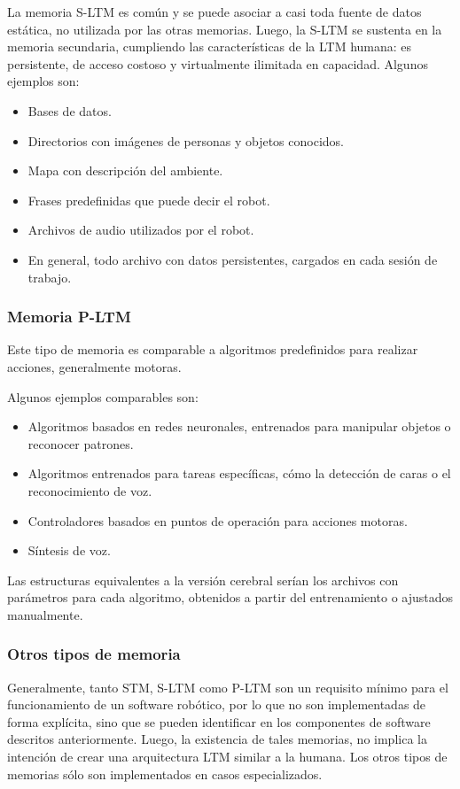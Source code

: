 La memoria S-LTM es común y se puede asociar a casi toda fuente de datos estática, no utilizada por las otras memorias. Luego, la S-LTM se sustenta en la memoria secundaria, cumpliendo las características de la LTM humana: es persistente, de acceso costoso y virtualmente ilimitada en capacidad. Algunos ejemplos son:
\begin{itemize}[topsep=0pt]
\setlength\itemsep{0.2em}
\item Bases de datos.
\item Directorios con imágenes de personas y objetos conocidos.
\item Mapa con descripción del ambiente.
\item Frases predefinidas que puede decir el robot.
\item Archivos de audio utilizados por el robot.
\item En general, todo archivo con datos persistentes, cargados en cada sesión de trabajo.
\end{itemize}


\subsubsection{Memoria P-LTM}

Este tipo de memoria es comparable a algoritmos predefinidos para realizar acciones, generalmente motoras. 

Algunos ejemplos comparables son: 
\begin{itemize}[topsep=0pt]
\setlength\itemsep{0.2em}
\item Algoritmos basados en redes neuronales, entrenados para manipular objetos o reconocer patrones.
\item Algoritmos entrenados para tareas específicas, cómo la detección de caras o el reconocimiento de voz.
\item Controladores basados en puntos de operación para acciones motoras.
\item Síntesis de voz.
\end{itemize}

Las estructuras equivalentes a la versión cerebral serían los archivos con parámetros para cada algoritmo, obtenidos a partir del entrenamiento o ajustados manualmente.


\subsubsection{Otros tipos de memoria}

Generalmente, tanto STM, S-LTM como P-LTM son un requisito mínimo para el funcionamiento de un software robótico, por lo que no son implementadas de forma explícita, sino que se pueden identificar en los componentes de software descritos anteriormente. Luego, la existencia de tales memorias, no implica la intención de crear una arquitectura LTM similar a la humana. Los otros tipos de memorias sólo son implementados en casos especializados.



